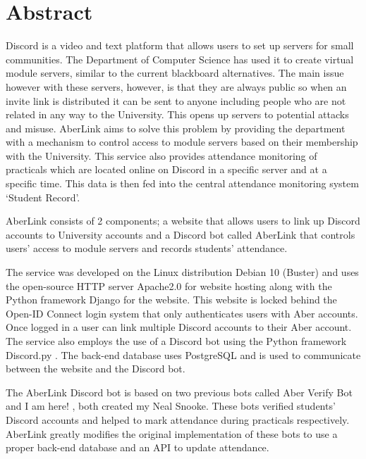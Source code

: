 \thispagestyle{empty}


\section*{\centering Abstract}

Discord \cite{discord} is a video and text platform that allows users to set up servers for small communities. The Department of Computer Science has used it to create virtual module servers, similar to the current blackboard alternatives. The main issue however with these servers, however, is that they are always public so when an invite link is distributed it can be sent to anyone including people who are not related in any way to the University. This opens up servers to potential attacks and misuse. AberLink aims to solve this problem by providing the department with a mechanism to control access to module servers based on their membership with the University. This service also provides attendance monitoring of practicals which are located online on Discord in a specific server and at a specific time. This data is then fed into the central attendance monitoring system `Student Record'.

AberLink consists of 2 components; a website that allows users to link up Discord \cite{discord} accounts to University accounts and a Discord bot called AberLink that controls users' access to module servers and records students' attendance. 

The service was developed on the Linux distribution Debian 10 (Buster) \cite{debian} and uses the open-source HTTP server Apache2.0 \cite{apache2} for website hosting along with the Python framework Django \cite{Django} for the website. This website is locked behind the Open-ID Connect \cite{OpenID} login system that only authenticates users with Aber accounts. Once logged in a user can link multiple Discord accounts to their Aber account. The service also employs the use of a Discord bot using the Python framework Discord.py \cite{discord.py}. The back-end database uses PostgreSQL \cite{psql} and is used to communicate between the website and the Discord bot. 

The AberLink Discord bot is based on two previous bots called Aber Verify Bot \cite{aber_verify} and I am here! \cite{i_am_here}, both created my Neal Snooke. These bots verified students' Discord accounts and helped to mark attendance during practicals respectively. AberLink greatly modifies the original implementation of these bots to use a proper back-end database and an API to update attendance.

